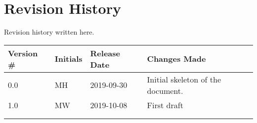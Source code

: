\thispagestyle{empty}
\section*{Revision History}

Revision history written here.

\begin{table}[H]
\begin{tabular}{llll}
\hline
Version \# & Initials & Release Date & Changes Made \\ \hline
0.0 & MH & 2019-09-30 & Initial skeleton of the document.\\
1.0 & MW & 2019-10-08 & First draft\\
 & & & \\
 & & & \\ \hline
\end{tabular}
\end{table}